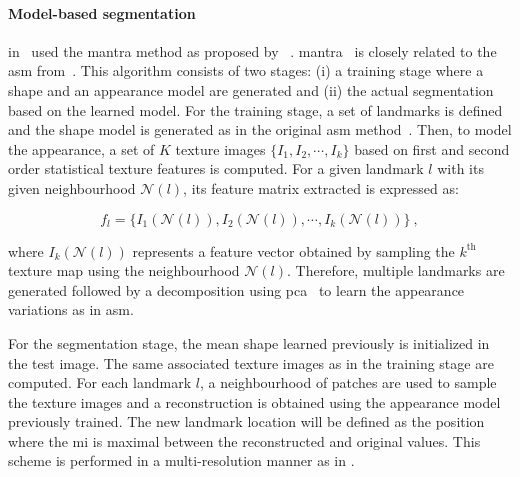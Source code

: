 \paragraph{Model-based segmentation}
\citeauthor{Viswanath2009} in~\cite{Viswanath2008a,Viswanath2009} used the \ac{mantra} method as proposed by \citeauthor{Toth2008}~\cite{Toth2008}.
\ac{mantra}~\cite{Toth2008} is closely related to the \ac{asm} from~\cite{Cootes1995}.
This algorithm consists of two stages: (i) a training stage where a shape and an appearance model are generated and (ii) the actual segmentation based on the learned model. 
For the training stage, a set of landmarks is defined and the shape model is generated as in the original \ac{asm} method~\cite{Cootes1995}.
Then, to model the appearance, a set of $K$ texture images $\{I_1,I_2,\cdots,I_k\}$ based on first and second order statistical texture features is computed.
For a given landmark $l$ with its given neighbourhood $\mathcal{N}(l)$, its feature matrix extracted is expressed as:

\begin{equation}
  f_l = \{ I_1(\mathcal{N}(l)), I_2(\mathcal{N}(l)), \cdots, I_k(\mathcal{N}(l)) \} \ ,
  \label{eq:mantra1}
\end{equation}

\noindent where $I_k(\mathcal{N}(l))$ represents a feature vector obtained by sampling the $k^{\text{th}}$ texture map using the neighbourhood $\mathcal{N}(l)$.
Therefore, multiple landmarks are generated followed by a decomposition using \ac{pca}~\cite{Pearson1901} to learn the appearance variations as in \ac{asm}.

For the segmentation stage, the mean shape learned previously is initialized in the test image.
The same associated texture images as in the training stage are computed.
For each landmark $l$, a neighbourhood of patches are used to sample the texture images and a reconstruction is obtained using the appearance model previously trained.
The new landmark location will be defined as the position where the \ac{mi} is maximal between the reconstructed and original values.
This scheme is performed in a multi-resolution manner as in \cite{Cootes1995}.

